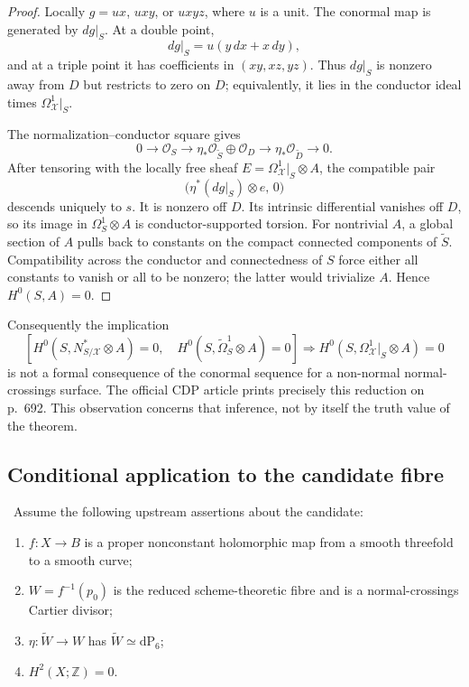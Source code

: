\begin{proof}
Locally $g=ux$, $uxy$, or $uxyz$, where $u$ is a unit. The conormal map is
generated by $dg|_S$. At a double point,
\[
 dg|_S=u(y\,dx+x\,dy),
\]
and at a triple point it has coefficients in $(xy,xz,yz)$. Thus $dg|_S$
is nonzero away from $D$ but restricts to zero on $D$; equivalently, it
lies in the conductor ideal times $\Omega^1_{\mathcal X}|_S$.

The normalization--conductor square gives
\[
0\longrightarrow\mathcal O_S\longrightarrow
 \eta_*\mathcal O_{\widetilde S}\oplus\mathcal O_D
 \longrightarrow\eta_*\mathcal O_{\widetilde D}\longrightarrow0.
\]
After tensoring with the locally free sheaf
$E=\Omega^1_{\mathcal X}|_S\otimes A$, the compatible pair
\[
 \bigl(\eta^*(dg|_S)\otimes e,\,0\bigr)
\]
descends uniquely to $s$. It is nonzero off $D$. Its intrinsic differential
vanishes off $D$, so its image in $\Omega^1_S\otimes A$ is
conductor-supported torsion. For nontrivial $A$, a global section of $A$
pulls back to constants on the compact connected components of
$\widetilde S$. Compatibility across the conductor and connectedness of
$S$ force either all constants to vanish or all to be nonzero; the latter
would trivialize $A$. Hence $H^0(S,A)=0$.
\end{proof}

Consequently the implication
\[
\left[
 H^0(S,N^*_{S/\mathcal X}\otimes A)=0,\quad
 H^0(S,\widetilde\Omega^1_S\otimes A)=0
\right]
\Longrightarrow
H^0(S,\Omega^1_{\mathcal X}|_S\otimes A)=0
\]
is not a formal consequence of the conormal sequence for a non-normal
normal-crossings surface. The official CDP article prints precisely this
reduction on p.~692. This observation concerns that inference, not by itself
the truth value of the theorem.

\subsection{Conditional application to the candidate fibre}

\Conditional\ Assume the following upstream assertions about the candidate:
\begin{enumerate}[label=(\roman*)]
\item $f:X\to B$ is a proper nonconstant holomorphic map from a smooth
threefold to a smooth curve;
\item $W=f^{-1}(p_0)$ is the reduced scheme-theoretic fibre and is a
normal-crossings Cartier divisor;
\item $\eta:\widetilde W\to W$ has
$\widetilde W\simeq\mathrm{dP}_6$;
\item $H^2(X;\mathbb Z)=0$.
\end{enumerate}

